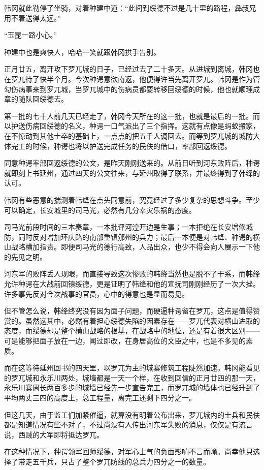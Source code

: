 韩冈就此勒停了坐骑，对着种建中道：“此间到绥德不过是几十里的路程，彝叔兄用不着送得太远。”

“玉昆一路小心。”

种建中也是爽快人，哈哈一笑就跟韩冈拱手告别。

正月廿五，离开攻下罗兀城的日子，已经过去了二十多天。从进城到离城，韩冈也在罗兀待了快半个月。今次种谔意欲南返，他便得许当先离开罗兀。韩冈是作为管勾伤病事来到罗兀城，当罗兀城中的伤病员都要转移回绥德的时候，他也就顺理成章的随队回绥德去。

第一批的七十人前几天已经走了，韩冈今天所在的这一批，也就是最后的一批。而以护送伤病回绥德的名义，种谔一口气派出了三个指挥。这就有点像是蚂蚁搬家，在不惊动到其他士卒的基础上，一点点的把五千人调回去。而等到罗兀城的城防大体完工的时候，种谔也将以护送完成任务的民伕的借口，率部回返绥德。

同意种谔率部回返绥德的公文，是昨天刚刚送来的。从前日听到河东败阵后，种谔就即刻上书延州，通过四天的公文往来，与延州取得了联系，并最终得到了韩绛的认可。

韩冈有些恶意的揣测着韩绛在点头同意前，究竟经过了多少复杂的思想斗争。至少可以确定，长安城里的司马光，必然有几分幸灾乐祸的态度。

司马光前段时间的三本奏章，一本批评河湟开边是生事；一本拒绝在长安增修城防，同时反对增加环庆路的南部重镇邠州的兵力；最后一本便是对韩绛、种谔的横山战略横加指责。即便司马光的德行高致，人品出众，也少不得会向人展示一下他的先见之明。

河东军的败阵丢人现眼，而直接导致这次惨败的韩绛当然也是脱不了干系，而韩绛允许种谔在大战前回镇绥德，更是证明了韩绛和他的宣抚司刚刚经历了一次大挫。许多事先反对今次战事的官员，心中的得意也是显而易见。

但不管怎么说，韩绛终究没有因为面子问题，而硬逼种谔留在罗兀，这点是值得赞赏的。虽然这其中，必然有着担心绥德失陷的因素存在——罗兀代表对横山进取的态度，而绥德却是整个横山战略的根基，在战略中的地位，还是有着很大区别——可是能够把面子放在一边，闻过即改，在身居高位的文臣之中，也是不多见的素质。

而在这等待延州回书的四天里，以罗兀为主的城寨修筑工程陡然加速。韩冈能看见的罗兀城和永乐川两处，城墙都是一天一个样，在收到回信的正月廿四的那一天，永乐川寨周长两百多步的城墙已经先一步宣告完工，而罗兀城的墙体也已经升到了平均两丈三四的高度上，总工程量，离完工还剩下四分之一。

但这几天，由于监工们加紧催逼，就算没有明着公布出来，罗兀城内的士兵和民伕都是知道情况有些不对了，不过尚没有人传出河东军失败的消息，仅仅是有流言说，西贼的大军即将抵达罗兀。

在这种情况下，种谔领军回师绥德，对军心士气的负面影响不言而喻。尚幸他只选择了带走五千兵，只占了整个罗兀防线的总兵力四分之一的数量。

